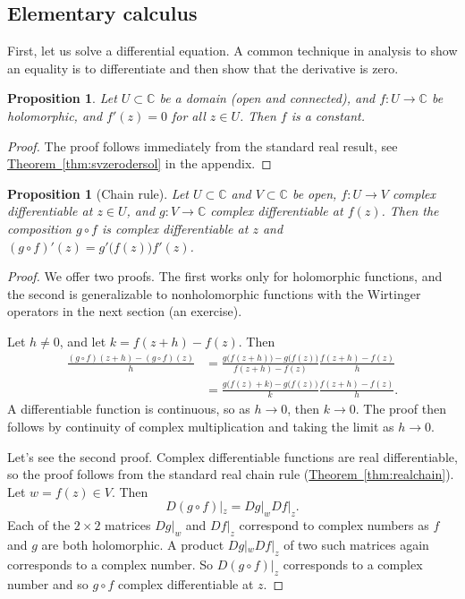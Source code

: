 \documentclass[12pt,openany]{book}
\newcommand{\C}{{\mathbb{C}}}
\theoremstyle{plain}
\newtheorem{prop}[thm]{Proposition}
\theoremstyle{remark}
\theoremstyle{definition}
\theoremstyle{exercise}
\theoremstyle{example}
\newcommand{\thmref}[1]{\hyperref[#1]{Theorem~\ref*{#1}}}
\begin{document}
\subsection{Elementary calculus}

First, let us solve a differential equation.  A common technique in analysis
to show an equality is to differentiate and then show that the derivative is
zero.

\begin{prop} \label{prop:zeroder}
Let $U \subset \C$ be a domain (open and connected),
and $f \colon U \to \C$ be holomorphic, and $f'(z) = 0$ for all $z \in U$.
Then $f$ is a constant.
\end{prop}

\begin{proof}
The proof follows immediately from the standard real result,
see \thmref{thm:svzerodersol} in the appendix.
\end{proof}

\begin{prop}[Chain rule] 
Let $U \subset \C$ and $V \subset \C$ be open, $f \colon U \to V$
complex differentiable at $z \in U$, and $g \colon V \to \C$ complex differentiable
at $f(z)$.  Then the composition $g \circ f$
is complex differentiable at $z$ and $(g \circ f)'(z) = g'\bigl(f(z)\bigr) f'(z)$.
\end{prop}

\begin{proof}
We offer two proofs.  The first works only for holomorphic
functions, and the second is generalizable to nonholomorphic functions
with the Wirtinger operators in the next section (an exercise).

Let $h \not= 0$, and let $k = f(z+h) -f(z)$.  Then
\begin{equation*}
\begin{split}
\frac{(g \circ f)(z+h) - (g \circ f)(z)}{h}
& =
\frac{g \bigl( f(z+h) \bigr) - g\bigl( f(z) \bigr)}{f(z+h)-f(z)}
\frac{f(z+h)-f(z)}{h}
\\
& =
\frac{g \bigl( f(z) + k \bigr) - g\bigl( f(z) \bigr)}{k}
\frac{f(z+h)-f(z)}{h} .
\end{split}
\end{equation*}
A differentiable function is continuous, so as $h \to 0$, then $k \to 0$.
The proof then follows by continuity of complex multiplication and taking
the limit as $h \to 0$.

Let's see the second proof.
Complex differentiable functions are real differentiable, so
the proof follows from the standard real chain rule (\thmref{thm:realchain}).
Let $w = f(z) \in V$.  Then
\begin{equation*}
D(g \circ f)|_z = Dg|_w Df|_z .
\end{equation*}
Each of the $2 \times 2$ matrices $Dg|_w$ and $Df|_z$ correspond to complex
numbers as $f$ and $g$ are both holomorphic.  A product $Dg|_w Df|_z$
of two such matrices again corresponds to a complex number.  So
$D(g \circ f)|_z$ corresponds to a complex number and so $g \circ f$
complex differentiable at $z$.
\end{proof}
\end{document}
